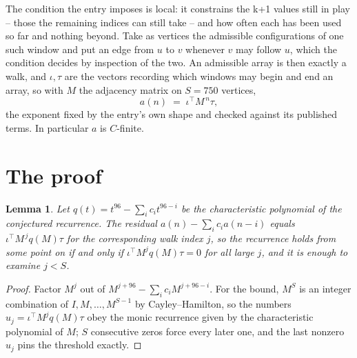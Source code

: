 \documentclass[11pt,a4paper]{article}
\theoremstyle{plain}
\newtheorem{lemma}[theorem]{Lemma}
\theoremstyle{definition}
\begin{document}
The condition the entry imposes is local: it constrains the k+1 values still in play -- those the remaining indices can still take -- and how often each has been used so far and nothing beyond. Take as vertices the admissible configurations of one such window and put an edge from $u$ to $v$ whenever $v$ may follow $u$, which the condition decides by inspection of the two.
An admissible array is then exactly a walk, and $\iota,\tau$ are the vectors recording which windows may begin and end an array, so with $M$ the adjacency matrix on $S=750$ vertices,
\[
a(n)\;=\;\iota^{\!\top}M^{\,n}\tau ,
\]
the exponent fixed by the entry's own shape and checked against its published terms. In
particular $a$ is $C$-finite.

\section{The proof}

\begin{lemma}\label{lem:crit}
Let $q(t)=t^{96}-\sum_i c_it^{96-i}$ be the characteristic polynomial of the
conjectured recurrence. The residual $a(n)-\sum_ic_ia(n-i)$ equals
$\iota^{\!\top}M^{\,j}q(M)\tau$ for the corresponding walk index $j$, so the recurrence
holds from some point on if and only if $\iota^{\!\top}M^{j}q(M)\tau=0$ for all large $j$,
and it is enough to examine $j<S$.
\end{lemma}

\begin{proof}
Factor $M^{j}$ out of $M^{j+96}-\sum_ic_iM^{j+96-i}$. For the bound, $M^{S}$
is an integer combination of $I,M,\dots,M^{S-1}$ by Cayley--Hamilton, so the numbers
$u_j=\iota^{\!\top}M^{j}q(M)\tau$ obey the monic recurrence given by the characteristic
polynomial of $M$; $S$ consecutive zeros force every later one, and the last nonzero $u_j$
pins the threshold exactly.
\end{proof}
\end{document}
